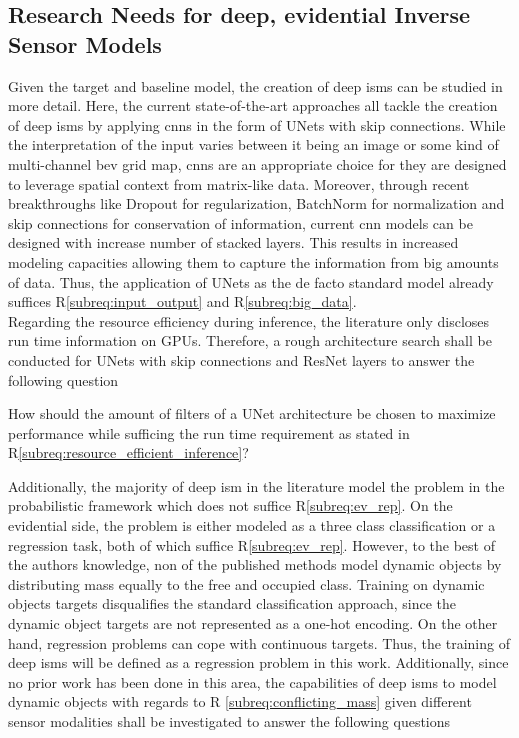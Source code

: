 %
\subsection{Research Needs for deep, evidential Inverse Sensor Models}
\label{subsec:research_needs_for_deep_isms}
Given the target and baseline model, the creation of deep \gls{ism}s can be studied in more detail. Here, the current state-of-the-art approaches all tackle the creation of deep \gls{ism}s by applying \gls{cnn}s in the form of UNets with skip connections. While the interpretation of the input varies between it being an image or some kind of multi-channel \gls{bev} grid map, \gls{cnn}s are an appropriate choice for they are designed to leverage spatial context from matrix-like data. Moreover, through recent breakthroughs like Dropout for regularization, BatchNorm for normalization and skip connections for conservation of information, current \gls{cnn} models can be designed with increase number of stacked layers. This results in increased modeling capacities allowing them to capture the information from big amounts of data. Thus, the application of UNets as the de facto standard model already suffices R\ref{subreq:input_output} and R\ref{subreq:big_data}.
\\ 
Regarding the resource efficiency during inference, the literature only discloses run time information on GPUs. Therefore, a rough architecture search shall be conducted for UNets with skip connections and ResNet layers to answer the following question\\
\begin{requ} \label{requ:network_search}
	How should the amount of filters of a UNet architecture be chosen to maximize performance while sufficing the run time requirement as stated in R\ref{subreq:resource_efficient_inference}?
\end{requ}
Additionally, the majority of deep \gls{ism} in the literature model the problem in the probabilistic framework which does not suffice R\ref{subreq:ev_rep}. On the evidential side, the problem is either modeled as a three class classification or a regression task, both of which suffice R\ref{subreq:ev_rep}. However, to the best of the authors knowledge, non of the published methods model dynamic objects by distributing mass equally to the free and occupied class. Training on dynamic objects targets disqualifies the standard classification approach, since the dynamic object targets are not represented as a one-hot encoding. On the other hand, regression problems can cope with continuous targets. Thus, the training of deep \gls{ism}s will be defined as a regression problem in this work. Additionally, since no prior work has been done in this area, the capabilities of deep \gls{ism}s to model dynamic objects with regards to R \ref{subreq:conflicting_mass} given different sensor modalities shall be investigated to answer the following questions

